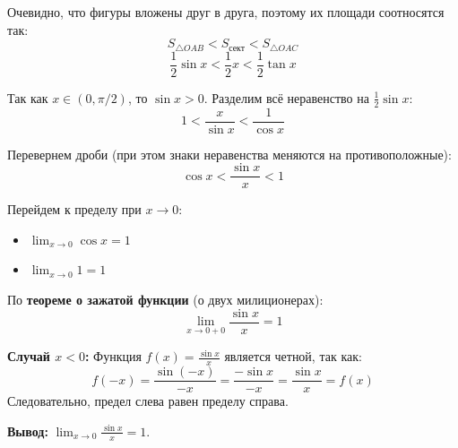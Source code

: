 \begin{tcolorbox}[title=Доказательство]
    Очевидно, что фигуры вложены друг в друга, поэтому их площади соотносятся так:
    \[ S_{\triangle OAB} < S_{\text{сект}} < S_{\triangle OAC} \]
    \[ \frac{1}{2} \sin x < \frac{1}{2} x < \frac{1}{2} \tan x \]
    
    Так как $x \in (0, \pi/2)$, то $\sin x > 0$. Разделим всё неравенство на $\frac{1}{2} \sin x$:
    \[ 1 < \frac{x}{\sin x} < \frac{1}{\cos x} \]
    
    Перевернем дроби (при этом знаки неравенства меняются на противоположные):
    \[ \cos x < \frac{\sin x}{x} < 1 \]
    
    Перейдем к пределу при $x \to 0$:
    \begin{itemize}
        \item $\lim_{x\to 0} \cos x = 1$
        \item $\lim_{x\to 0} 1 = 1$
    \end{itemize}
    
    По \textbf{теореме о зажатой функции} (о двух милиционерах):
    \[ \lim_{x \to 0+0} \frac{\sin x}{x} = 1 \]
    
    \textbf{Случай $x < 0$:}
    Функция $f(x) = \frac{\sin x}{x}$ является четной, так как:
    \[ f(-x) = \frac{\sin(-x)}{-x} = \frac{-\sin x}{-x} = \frac{\sin x}{x} = f(x) \]
    Следовательно, предел слева равен пределу справа.
    
    \textbf{Вывод:} $\lim_{x \to 0} \frac{\sin x}{x} = 1$.
\end{tcolorbox}

